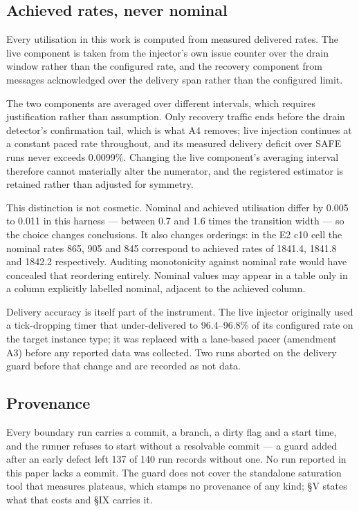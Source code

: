 \documentclass{ieeeaccess}
\begin{document}
\subsection{Achieved rates, never nominal}

Every utilisation in this work is computed from measured delivered rates. The live component is taken from the injector's own issue counter over the drain window rather than the configured rate, and the recovery component from messages acknowledged over the delivery span rather than the configured limit.

The two components are averaged over different intervals, which requires justification rather than assumption. Only recovery traffic ends before the drain detector's confirmation tail, which is what A4 removes; live injection continues at a constant paced rate throughout, and its measured delivery deficit over SAFE runs never exceeds 0.0099\%. Changing the live component's averaging interval therefore cannot materially alter the numerator, and the registered estimator is retained rather than adjusted for symmetry.

This distinction is not cosmetic. Nominal and achieved utilisation differ by 0.005 to 0.011 in this harness --- between 0.7 and 1.6 times the transition width --- so the choice changes conclusions. It also changes orderings: in the E2 c10 cell the nominal rates 865, 905 and 845 correspond to achieved rates of 1841.4, 1841.8 and 1842.2 respectively. Auditing monotonicity against nominal rate would have concealed that reordering entirely. Nominal values may appear in a table only in a column explicitly labelled nominal, adjacent to the achieved column.

Delivery accuracy is itself part of the instrument. The live injector originally used a tick-dropping timer that under-delivered to 96.4--96.8\% of its configured rate on the target instance type; it was replaced with a lane-based pacer (amendment A3) before any reported data was collected. Two runs aborted on the delivery guard before that change and are recorded as not data.

\subsection{Provenance}

Every boundary run carries a commit, a branch, a dirty flag and a start time, and the runner refuses to start without a resolvable commit --- a guard added after an early defect left 137 of 140 run records without one. No run reported in this paper lacks a commit. The guard does not cover the standalone saturation tool that measures plateaus, which stamps no provenance of any kind; \S{}V states what that costs and \S{}IX carries it.
\end{document}
